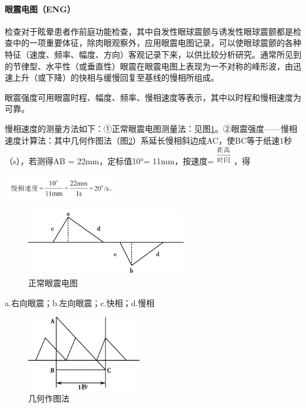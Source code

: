 \paragraph{眼震电图（ENG）}

检查对于眩晕患者作前庭功能检查，其中自发性眼球震颤与诱发性眼球震颤都是检查中的一项重要体征，除肉眼观察外，应用眼震电图记录，可以使眼球震颤的各种特征（速度、频率、幅度、方向）客观记录下来，以供比较分析研究。通常所见到的节律型、水平性（或垂直性）眼震在眼震电图上表现为一不对称的峰形波，由迅速上升（或下降）的快相与缓慢回复至基线的慢相所组成。

眼震强度可用眼震时程、幅度、频率、慢相速度等表示，其中以时程和慢相速度为可靠。

慢相速度的测量方法如下：①正常眼震电图测量法：见图\ref{fig3-1}。②眼震强度------慢相速度计算法：其中几何作图法（图\ref{fig3-2}）系延长慢相斜边成AC，使BC等于纸速1秒（s），若测得AB
= 22mm，定标值10°=
11mm，按速度=\includegraphics[width=0.30208in,height=0.32292in]{./images/Image00009.jpg}
，得

\includegraphics[width=1.95833in,height=0.42708in]{./images/Image00010.jpg}

\begin{figure}[!htbp]
 \centering
 \includegraphics[width=2.75in,height=1.13542in]{./images/Image00011.jpg}
 \captionsetup{justification=centering}
 \caption{正常眼震电图}
 \label{fig3-1}
  \end{figure} 

a.右向眼震；b.左向眼震；c.快相；d.慢相

\begin{figure}[!htbp]
 \centering
 \includegraphics[width=1.96875in,height=1.29167in]{./images/Image00012.jpg}
 \captionsetup{justification=centering}
 \caption{几何作图法}
 \label{fig3-2}
  \end{figure} 

